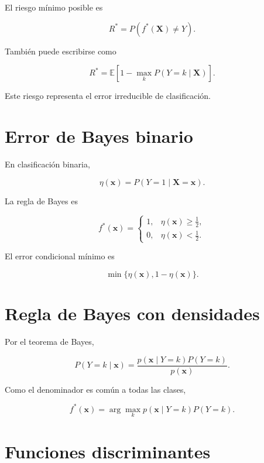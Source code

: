 \documentclass[
  spanish,
  10.5pt,
  letterpaper,
  DIV=11,
  numbers=noendperiod,
  oneside,
  open=any]{scrreprt}
\theoremstyle{definition}
\theoremstyle{definition}
\theoremstyle{plain}
\theoremstyle{remark}
\begin{document}

El riesgo mínimo posible es

\[
R^{*}
=
P(
f^{*}(\mathbf{X})\neq Y
).
\]

También puede escribirse como

\[
R^{*}
=
\mathbb{E}
\left[
1-
\max_k
P(Y=k\mid\mathbf{X})
\right].
\]

Este riesgo representa el error irreducible de clasificación.

\section*{Error de Bayes binario}\label{error-de-bayes-binario}


En clasificación binaria,

\[
\eta(\mathbf{x})
=
P(Y=1\mid\mathbf{X}=\mathbf{x}).
\]

La regla de Bayes es

\[
f^{*}(\mathbf{x})
=
\begin{cases}
1, & \eta(\mathbf{x})\geq \frac{1}{2},\\
0, & \eta(\mathbf{x})<\frac{1}{2}.
\end{cases}
\]

El error condicional mínimo es

\[
\min
\{
\eta(\mathbf{x}),
1-\eta(\mathbf{x})
\}.
\]

\section*{Regla de Bayes con
densidades}\label{regla-de-bayes-con-densidades}


Por el teorema de Bayes,

\[
P(Y=k\mid\mathbf{x})
=
\frac{
p(\mathbf{x}\mid Y=k)P(Y=k)
}{
p(\mathbf{x})
}.
\]

Como el denominador es común a todas las clases,

\[
f^{*}(\mathbf{x})
=
\arg\max_k
p(\mathbf{x}\mid Y=k)P(Y=k).
\]

\section*{Funciones discriminantes}\label{funciones-discriminantes}
\end{document}
